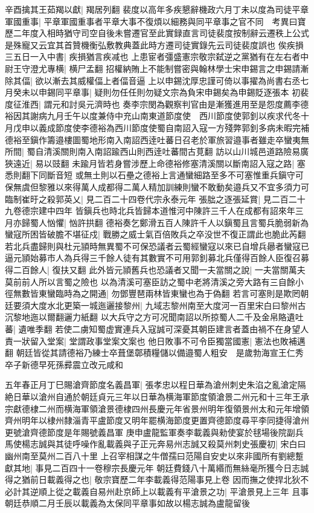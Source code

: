 辛酉擒其王茹羯以獻|{
	羯居列翻}
裴度以高年多疾懇辭機政六月丁未以度為司徒平章軍國重事|{
	平章軍國重事者平章大事不復煩以細務與同平章事之官不同　考異曰寶歷二年度入相時猶守司空自後未嘗遷官至此實録直言司徒裴度按制辭云遷秩上公式是殊寵又云宜其首贊機衡弘敷教典蓋此時方遷司徒實錄先云司徒裴度誤也}
俟疾損三五日一入中書|{
	疾損猶言疾减也}
上患宦者彊盛憲宗敬宗弑逆之黨猶有在左右者中尉王守澄尤專横|{
	横尸孟翻}
招權納賄上不能制嘗密與翰林學士宋申錫言之申錫請漸除其偪|{
	欲以漸去其威權偪上者偪音逼}
上以申錫沈厚忠謹可倚以事擢為尚書右丞七月癸未以申錫同平章事|{
	疑則勿任任則勿疑文宗為負宋申錫矣為申錫貶逐張本}
初裴度征淮西|{
	謂元和討吳元濟時也}
奏李宗閔為觀察判官由是漸獲進用至是怨度薦李德裕因其謝病九月壬午以度兼侍中充山南東道節度使　西川節度使郭釗以疾求代冬十月戊申以義成節度使李德裕為西川節度使蜀自南詔入寇一方殘弊郭釗多病未暇完補德裕至鎭作籌邉樓圖蜀地形南入南詔西逹吐蕃日召老於軍旅習邉事者雖走卒蠻夷無所間|{
	蜀自清溪關則南入南詔踰西山則西逹吐蕃間古莧翻}
訪以山川城邑道路險易廣狹遠近|{
	易以豉翻}
未踰月皆若身嘗涉歷上命德裕修塞清溪關以斷南詔入寇之路|{
	塞悉則翻下同斷音短}
或無土則以石壘之德裕上言通蠻細路至多不可塞惟重兵鎭守可保無虞但黎雅以來得萬人成都得二萬人精加訓練則蠻不敢動矣邉兵又不宜多須力可臨制崔旴之殺郭英乂|{
	見二百二十四卷代宗永泰元年}
張朏之逐張延賞|{
	見二百二十九卷德宗建中四年}
皆鎭兵也時北兵皆歸本道惟河中陳許三千人在成都有詔來年三月亦歸蜀人忷懼|{
	忷許拱翻}
德裕奏乞鄭滑五百人陳許千人以鎭蜀且言蜀兵脆弱新為蠻寇所困皆破膽不堪征戍|{
	戰勝之威士氣百倍敗兵之卒没世不復正謂此也脆此芮翻}
若北兵盡歸則與杜元頴時無異蜀不可保恐議者云蜀經蠻寇以來已自增兵曏者蠻寇已逼元頴始募市人為兵得三千餘人徒有其數實不可用郭釗募北兵僅得百餘人臣復召募得二百餘人|{
	復扶又翻}
此外皆元頴舊兵也恐議者又聞一夫當關之說|{
	一夫當關萬夫莫前前人所以言蜀之險也}
以為清溪可塞臣訪之蜀中老將清溪之旁大路有三自餘小徑無數皆東蠻臨時為之開通|{
	勿鄧豐琶兩林皆東蠻也為于偽翻}
若言可塞則是欺罔朝廷要須大度水北更築一城迤邐接黎州|{
	九域志黎州南至大度河一百里宋白曰黎州古沉黎地迤以爾翻邐力紙翻}
以大兵守之方可况聞南詔以所掠蜀人二千及金帛賂遺吐蕃|{
	遺唯季翻}
若使二虜知蜀虚實連兵入寇誠可深憂其朝臣建言者蓋由禍不在身望人責一狀留入堂案|{
	堂謂政事堂案文案也}
他日敗事不可令臣獨當國憲|{
	憲法也敗補邁翻}
朝廷皆從其請德裕乃練士卒葺堡鄣積糧儲以備邉蜀人粗安　是歲勃海宣王仁秀卒子新德早死孫彛震立改元咸和

五年春正月丁巳賜滄齊節度名義昌軍|{
	張孝忠以程日華為滄州刺史朱淊之亂滄定隔絶日華以滄州自通於朝廷貞元三年以日華為横海軍節度領滄景二州元和十三年王承宗獻德棣二州而横海軍領滄景德棣四州長慶元年省景州明年復領景州太和元年增領齊州明年以棣州隸淄青平盧節度又明年罷横海節度更置齊德節度尋平李同捷得滄州更號滄齊德節度是年賜號義昌軍}
庚申盧龍監軍奏李載義與勑使宴於毬場後院副兵馬使楊志誠與其徒呼噪作亂載義與子正元奔易州志誠又殺莫州刺史張慶初|{
	宋白曰幽州南至莫州二百八十里}
上召宰相謀之牛僧孺曰范陽自安史以來非國所有劉總蹔獻其地|{
	事見二百四十一卷穆宗長慶元年}
朝廷費錢八十萬緡而無絲毫所獲今日志誠得之猶前日載義得之也|{
	敬宗寶歷二年李載義得范陽事見上卷}
因而撫之使捍北狄不必計其逆順上從之載義自易州赴京師上以載義有平滄景之功|{
	平滄景見上三年}
且事朝廷恭順二月壬辰以載義為太保同平章事如故以楊志誠為盧龍留後


